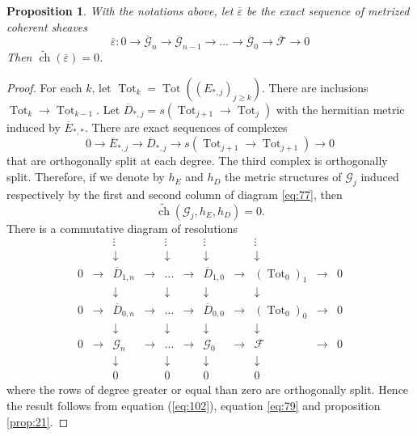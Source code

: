 \documentclass[10pt,twoside]{article}
\numberwithin{equation}{section}
\theoremstyle{plain}
\newtheorem{proposition}[equation]{Proposition}
\theoremstyle{definition}
\DeclareMathOperator{\Tot}{Tot}
\DeclareMathOperator{\ch}{ch}
\begin{document}
\begin{proposition}\label{prop:13} With the notations above, let
  $\overline {\varepsilon }$ be the exact sequence of metrized
  coherent sheaves
\begin{displaymath}
 \overline{\varepsilon} \colon 0\rightarrow \overline{\mathcal{G}}_{n}\rightarrow
 \overline{\mathcal{G}}_{n-1}\rightarrow 
\dots \rightarrow
  \overline{\mathcal{G}}_{0} \rightarrow \overline{\mathcal{F}}\rightarrow 0
\end{displaymath}
Then $\widetilde {\ch}(\overline{\varepsilon })=0$.
\end{proposition}
\begin{proof}
  For each $k$, let $\Tot_{k}=\Tot((E_{\ast,j})_{j\ge k})$. There are 
  inclusions $\Tot_{k}\longrightarrow \Tot_{k-1}$. Let 
  $\overline D_{\ast,j}=s(\Tot_{j+1}\to \Tot_{j})$ with the hermitian
  metric induced by $\overline E_{\ast,\ast}$. There are exact sequences of
  complexes
  \begin{equation}\label{eq:77}
    0\longrightarrow \overline E_{\ast,j}\longrightarrow
    \overline D_{\ast,j}\longrightarrow 
    s(\Tot_{j+1}\to \Tot_{j+1})\longrightarrow 0
  \end{equation}
  that are orthogonally split at each degree. The third complex is
  orthogonally split. Therefore, if we denote by $h_{E}$ and $h_{D}$ the metric
  structures of $\mathcal{G}_{j}$ induced respectively by the first
  and second column of diagram \eqref{eq:77}, then
  \begin{equation}
    \label{eq:79}
    \widetilde {\ch}(\mathcal{G}_{j},h_{E},h_{D})=0.
  \end{equation}
  There is a commutative diagram of resolutions
  $$\begin{array}{ccccccccccc}
    && \vdots && \vdots && \vdots && \vdots &&\\
    && \downarrow && \downarrow && \downarrow && \downarrow &&\\
    0 &\rightarrow & \overline{D}_{1,n} & \rightarrow &
    \ldots & \rightarrow &
    \overline{D}_{1,0} &\rightarrow &(\Tot_{0})_{1} & \rightarrow & 0\\
    && \downarrow && \downarrow && \downarrow && \downarrow &&\\
    0 &\rightarrow & \overline{D}_{0,n} & \rightarrow &
    \ldots & \rightarrow &
    \overline{D}_{0,0} &\rightarrow & (\Tot_{0})_{0} &\rightarrow &0\\
    && \downarrow && \downarrow && \downarrow && \downarrow &&\\
    0 & \rightarrow & \mathcal{G}_{n} & \rightarrow &
    \ldots & \rightarrow &
    \mathcal{G}_{0} & \rightarrow & \mathcal{F}
    &\rightarrow & 0 \\
    && \downarrow && \downarrow && \downarrow &&\downarrow && \\
    && 0 && 0 && 0 && 0 &&
  \end{array}$$
  where the rows of degree greater or equal than zero are orthogonally
  split. Hence the result follows from equation (\ref{eq:102}), 
  equation \eqref{eq:79} and proposition \ref{prop:21}.
\end{proof}
\end{document}

